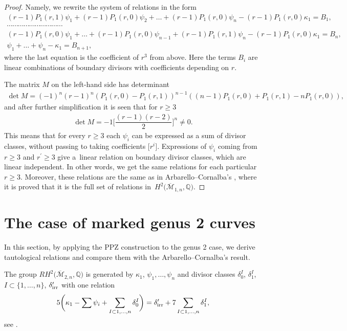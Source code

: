 \documentclass[pdftex]{sigma}
\def\oM{\overline{\mathcal{M}}}
\numberwithin{equation}{section}
\begin{document}
\begin{proof}
Namely, we rewrite the system of relations in the form
\begin{gather*}
(r-1)P_1(r,1)\psi_1+(r-1)P_1(r,0)\psi_2+\dots+(r-1)P_1(r,0)\psi_n -(r-1)P_1(r,0)\kappa_1 =B_1,
\\
\cdots\cdots\cdots\cdots\cdots\cdots\cdots\cdots\cdots\cdots
\\
(r-1)P_1(r,0)\psi_1 + \dots + (r-1)P_1(r,0)\psi_{n-1}\!+(r-1)P_1(r,1)\psi_n\!-(r-1)P_1(r,0)\kappa_1 =B_n,
\\
\psi_1 +\dots+ \psi_n - \kappa_1 = B_{n+1},
\end{gather*}
where the last equation is the coefficient of $r^3$ from above.
Here the terms $B_i$ are linear combinations of boundary divisors with coefficients depending on $r$.

The matrix $M$ on the left-hand side has determinant
\begin{align*}
\det M = (-1)^n(r-1)^{n}(P_1(r,0) - P_1(r,1))^{n-1}((n-1)P_1(r,0) + P_1(r,1)- nP_1(r,0)),
\end{align*}
and after further simplification it is seen that for $ r \geq 3$
\begin{align*}
\det M= -1\Bigg[\dfrac{(r-1)(r-2)}{2}\Bigg]^n \neq 0.
\end{align*}
This means that for every $r\geq3$ each $\psi_i$ can be expressed as a sum of divisor classes, without passing to taking coefficients $\big[r^i\big]$. Expressions of $\psi_i$ coming from $r\geq3$ and $r^{\prime}\geq3$ give a~linear relation on boundary divisor classes, which are linear independent. In other words,
we get the same relations for each particular $r\geq3$. Moreover, these relations are the same as in Arbarello--Cornalba's \cite[Theorem 2.2]{Cor}, where it is proved that it is the full set of relations in~$H^2\big(\oM_{1,n},\mathbb{Q}\big)$.
\end{proof}

\section{The case of marked genus 2 curves}
In this section, by applying the PPZ construction to the genus 2 case, we derive tautological relations and compare them with the Arbarello--Cornalba's result.

The group $RH^2\big(\oM_{2,n},\mathbb{Q}\big)$ is generated by $\kappa_1$, $\psi_1,\dots,\psi_n$ and divisor classes $\delta_0^I$, $\delta_1^I$, $I\subset\{1,\dots,n\}$, $\delta^{\prime}_{\rm irr}$ with one relation
\begin{align*}
	5\bigg(\kappa_1 - \sum \psi_i + \sum_{I\subset{1,\dots,n}}\delta_0^{I}\bigg) = \delta_{\rm irr}^{\prime} + 7\sum_{I\subset{1,\dots,n}}\delta_1^{I},
\end{align*}
see \cite[Theorem 2.2]{Cor}.
\end{document}
